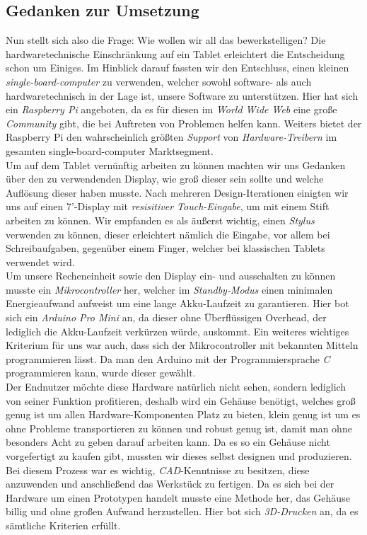 \subsection{Gedanken zur Umsetzung}
Nun stellt sich also die Frage: Wie wollen wir all das bewerkstelligen? Die hardwaretechnische Einschränkung auf ein Tablet erleichtert die Entscheidung schon um Einiges. Im Hinblick darauf fassten wir den Entschluss, einen kleinen \textit{single-board-computer} zu verwenden, welcher sowohl software- als auch hardwaretechnisch in der Lage ist, unsere Software zu unterstützen. Hier hat sich ein \textit{Raspberry Pi} angeboten, da es für diesen im \textit{World Wide Web} eine große \textit{Community} gibt, die bei Auftreten von Problemen helfen kann. Weiters bietet der Raspberry Pi den wahrscheinlich größten \textit{Support} von \textit{Hardware-Treibern} im gesamten single-board-computer Marktsegment.\\

Um auf dem Tablet vernünftig arbeiten zu können machten wir uns Gedanken über den zu verwendenden Display, wie groß dieser sein sollte und welche Auflösung dieser haben musste. Nach mehreren Design-Iterationen einigten wir uns auf einen 7'-Display mit \textit{resisitiver Touch-Eingabe}, um mit einem Stift arbeiten zu können. Wir empfanden es als äußerst wichtig, einen \textit{Stylus} verwenden zu können, dieser erleichtert nämlich die Eingabe, vor allem bei Schreibaufgaben, gegenüber einem Finger, welcher bei klassischen Tablets verwendet wird.\\

Um unsere Recheneinheit sowie den Display ein- und ausschalten zu können musste ein \textit{Mikrocontroller} her, welcher im \textit{Standby-Modus} einen minimalen Energieaufwand aufweist um eine lange Akku-Laufzeit zu garantieren. Hier bot sich ein \textit{Arduino Pro Mini} an, da dieser ohne Überflüssigen Overhead, der lediglich die Akku-Laufzeit verkürzen würde, auskommt. Ein weiteres wichtiges Kriterium für uns war auch, dass sich der Mikrocontroller mit bekannten Mitteln programmieren lässt. Da man den Arduino mit der Programmiersprache \textit{C} programmieren kann, wurde dieser gewählt.\\

Der Endnutzer möchte diese Hardware natürlich nicht sehen, sondern lediglich von seiner Funktion profitieren, deshalb wird ein Gehäuse benötigt, welches groß genug ist um allen Hardware-Komponenten Platz zu bieten, klein genug ist um es ohne Probleme transportieren zu können und robust genug ist, damit man ohne besonders Acht zu geben darauf arbeiten kann. Da es so ein Gehäuse nicht vorgefertigt zu kaufen gibt, mussten wir dieses selbst designen und produzieren. Bei diesem Prozess war es wichtig, \textit{CAD}-Kenntnisse zu besitzen, diese anzuwenden und anschließend das Werkstück zu fertigen. Da es sich bei der Hardware um einen Prototypen handelt musste eine Methode her, das Gehäuse billig und ohne großen Aufwand herzustellen. Hier bot sich \textit{3D-Drucken} an, da es sämtliche Kriterien erfüllt.\\

